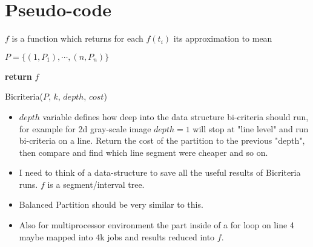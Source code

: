 \documentclass[12pt, a4paper]{article}
\begin{document}
    \section{Pseudo-code}
\(f\) is a function which returns for each \(f(t_i)\) its approximation to mean


\begin{algorithm}


$P=\{(1,P_1),\cdots,(n, P_n)\}$     

\textbf{return} $f$\;

\caption{Bicriteria($P$, $k$, $depth$, $cost$)}
\end{algorithm}


\begin{itemize}
  \item $depth$ variable defines how deep into the data structure bi-criteria should run,
  for example for 2d gray-scale image $depth = 1$ will stop at "line level" and run bi-criteria
  on a line. Return the cost of the partition to the previous "depth", then compare and find
  which line segment were cheaper and so on.

  \item I need to think of a data-structure to save all the useful results of Bicriteria runs.
  $f$ is a segment/interval tree.

  \item Balanced Partition should be very similar to this.

  \item Also for multiprocessor environment the part inside of a for loop on line 4 maybe mapped into 4k jobs and results reduced into $f$.
\end{itemize}
\end{document}
